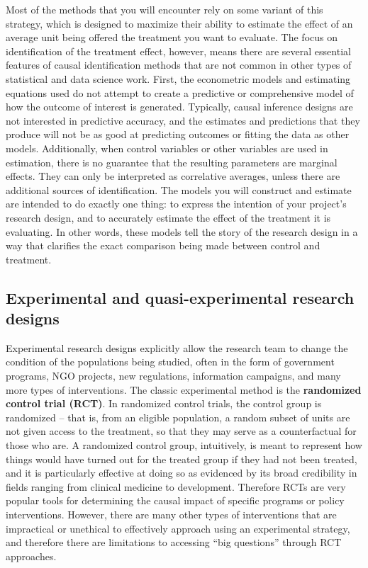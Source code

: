 Most of the methods that you will encounter rely on some variant of this strategy,
which is designed to maximize their ability to estimate the effect
of an average unit being offered the treatment you want to evaluate.
The focus on identification of the treatment effect, however,
means there are several essential features of causal identification methods
that are not common in other types of statistical and data science work.
First, the econometric models and estimating equations used
do not attempt to create a predictive or comprehensive model
of how the outcome of interest is generated.
Typically, causal inference designs are not interested in predictive accuracy,
and the estimates and predictions that they produce
will not be as good at predicting outcomes or fitting the data as other models.
Additionally, when control variables or other variables are used in estimation,
there is no guarantee that the resulting parameters are marginal effects.
They can only be interpreted as correlative averages,
unless there are additional sources of identification.
The models you will construct and estimate are intended to do exactly one thing:
to express the intention of your project's research design,
and to accurately estimate the effect of the treatment it is evaluating.
In other words, these models tell the story of the research design
in a way that clarifies the exact comparison being made between control and treatment.

\subsection{Experimental and quasi-experimental research designs}

Experimental research designs explicitly allow the research team
to change the condition of the populations being studied,
often in the form of government programs, NGO projects, new regulations,
information campaigns, and many more types of interventions.\cite{banerjee2009experimental}
The classic experimental method is the \textbf{randomized control trial (RCT)}.
In randomized control trials, the control group is randomized --
that is, from an eligible population,
a random subset of units are not given access to the treatment,
so that they may serve as a counterfactual for those who are.
A randomized control group, intuitively, is meant to represent
how things would have turned out for the treated group
if they had not been treated, and it is particularly effective at doing so
as evidenced by its broad credibility in fields ranging from clinical medicine to development.
Therefore RCTs are very popular tools for determining the causal impact
of specific programs or policy interventions.
However, there are many other types of interventions that are impractical or unethical
to effectively approach using an experimental strategy,
and therefore there are limitations to accessing ``big questions''
through RCT approaches.

